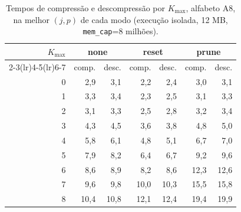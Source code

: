 \begin{table}[H]
\centering
\small
\caption{Tempos de compress\~ao e descompress\~ao por $K_{\max}$, alfabeto A8, na melhor $(j,p)$ de cada modo (execu\c{c}\~ao isolada, 12 MB, \texttt{mem\_cap}=8 milh\~oes).}
\label{tab:times-A8}
\begin{tabular}{rrrrrrr}
\toprule
$K_{\max}$ & \multicolumn{2}{c}{none} & \multicolumn{2}{c}{reset} & \multicolumn{2}{c}{prune} \\
\cmidrule(lr){2-3}\cmidrule(lr){4-5}\cmidrule(lr){6-7}
 & comp. & desc. & comp. & desc. & comp. & desc. \\
\midrule
0 & 2,9 & 3,1 & 2,2 & 2,4 & 3,0 & 3,1 \\
1 & 3,3 & 3,4 & 2,3 & 2,5 & 3,1 & 3,3 \\
2 & 3,1 & 3,3 & 2,5 & 2,8 & 3,2 & 3,4 \\
3 & 4,3 & 4,5 & 3,6 & 3,8 & 4,8 & 5,0 \\
4 & 5,8 & 6,1 & 4,8 & 5,1 & 6,7 & 7,0 \\
5 & 7,9 & 8,2 & 6,4 & 6,7 & 9,2 & 9,6 \\
6 & 8,6 & 8,9 & 8,2 & 8,6 & 12,3 & 12,6 \\
7 & 9,6 & 9,8 & 10,0 & 10,3 & 15,5 & 15,8 \\
8 & 10,4 & 10,8 & 12,1 & 12,4 & 19,4 & 19,9 \\
\bottomrule
\end{tabular}
\end{table}
